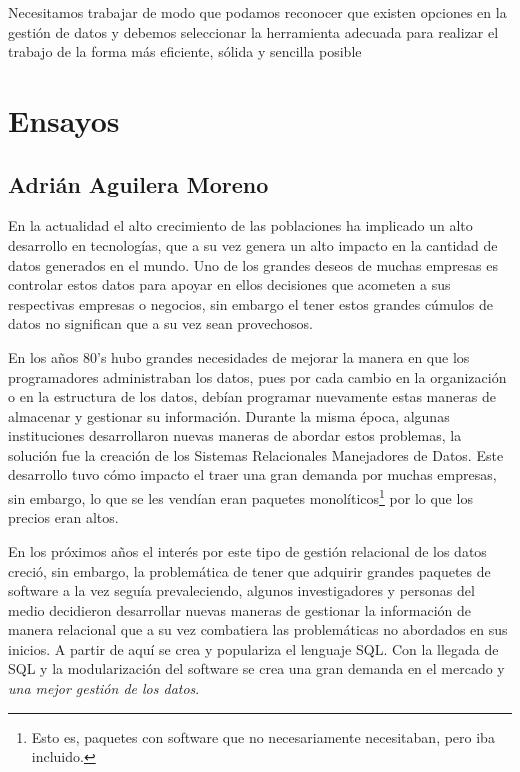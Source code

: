 \documentclass[12pt]{article}
\begin{document}
    Necesitamos trabajar de modo que podamos reconocer que existen opciones en la gestión de datos y debemos seleccionar la herramienta adecuada para realizar el trabajo de la forma más eficiente, sólida y sencilla posible

    
\newpage

\section*{Ensayos}

\subsection*{Adrián Aguilera Moreno}

En la actualidad el alto crecimiento de las poblaciones ha implicado un alto desarrollo en tecnologías, que a su vez genera un alto impacto en la cantidad de datos generados en el mundo. Uno de los grandes deseos de muchas empresas es controlar estos datos para apoyar en ellos decisiones que acometen a sus respectivas empresas o negocios, sin embargo el tener estos grandes cúmulos de datos no significan que a su vez sean provechosos.\newline

En los años 80's hubo grandes necesidades de mejorar la manera en que los programadores administraban los datos, pues por cada cambio en la organización o en la estructura de los datos, debían programar nuevamente estas maneras de almacenar y gestionar su información. Durante la misma época, algunas instituciones desarrollaron nuevas maneras de abordar estos problemas, la solución fue la creación de los Sistemas Relacionales Manejadores de Datos. Este desarrollo tuvo cómo impacto el traer una gran demanda por muchas empresas, sin embargo, lo que se les vendían eran paquetes monolíticos\footnote{Esto es, paquetes con software que no necesariamente necesitaban, pero iba incluido.} por lo que los precios eran altos.\newline

En los próximos años el interés por este tipo de gestión relacional de los datos creció, sin embargo, la problemática de tener que adquirir grandes paquetes de software a la vez seguía prevaleciendo, algunos investigadores y personas del medio decidieron desarrollar nuevas maneras de gestionar la información de manera relacional que a su vez combatiera las problemáticas no abordados en sus inicios. A partir de aquí se crea y populariza el lenguaje SQL. Con la llegada de SQL y la modularización del software se crea una gran demanda en el mercado y \textit{una mejor gestión de los datos}.\newline
\end{document}
